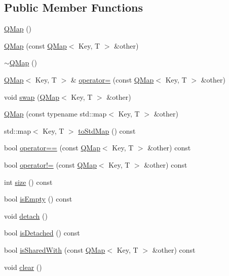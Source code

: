 \subsection*{Public Member Functions}
\begin{DoxyCompactItemize}
\item 
\hyperlink{class_q_map_a72c9b87bd2e154fc1a0afc0bd6cc4223}{Q\+Map} ()
\item 
\hyperlink{class_q_map_ab4f75cfffb9554773b5fad068720f00e}{Q\+Map} (const \hyperlink{class_q_map}{Q\+Map}$<$ Key, T $>$ \&other)
\item 
\hyperlink{class_q_map_aa171c2af7b745664c156055dc53a3929}{$\sim$\+Q\+Map} ()
\item 
\hyperlink{class_q_map}{Q\+Map}$<$ Key, T $>$ \& \hyperlink{class_q_map_ad04759cfb5b1ed0f3d35a2a16f45ae54}{operator=} (const \hyperlink{class_q_map}{Q\+Map}$<$ Key, T $>$ \&other)
\item 
void \hyperlink{class_q_map_ac85cda6eaaa3b14867da113f6f69acc3}{swap} (\hyperlink{class_q_map}{Q\+Map}$<$ Key, T $>$ \&other)
\item 
\hyperlink{class_q_map_a2ad69d3ba805cd31d586b26218f16dd6}{Q\+Map} (const typename std\+::map$<$ Key, T $>$ \&other)
\item 
std\+::map$<$ Key, T $>$ \hyperlink{class_q_map_aafa61193d3960d804719c2e611533438}{to\+Std\+Map} () const 
\item 
bool \hyperlink{class_q_map_afe77d0e5e8feb53142b48b2e9ec8b7fa}{operator==} (const \hyperlink{class_q_map}{Q\+Map}$<$ Key, T $>$ \&other) const 
\item 
bool \hyperlink{class_q_map_a0e25c738535f0c64fe684d7e89097d57}{operator!=} (const \hyperlink{class_q_map}{Q\+Map}$<$ Key, T $>$ \&other) const 
\item 
int \hyperlink{class_q_map_a1e80b0b61a702ec2996f6a3d01425108}{size} () const 
\item 
bool \hyperlink{class_q_map_a33cfb24195273a5e70dcc48644368a99}{is\+Empty} () const 
\item 
void \hyperlink{class_q_map_a6913ba3a784e35a4b0d274f229af92ea}{detach} ()
\item 
bool \hyperlink{class_q_map_a0386f837a8b99aca59b01d7c5d04b202}{is\+Detached} () const 
\item 
bool \hyperlink{class_q_map_ae5cfba01ae8fc15b7b05ccc76129385f}{is\+Shared\+With} (const \hyperlink{class_q_map}{Q\+Map}$<$ Key, T $>$ \&other) const 
\item 
void \hyperlink{class_q_map_acdbbd64e3cd0a6dae1ac57c1d41aacab}{clear} ()

\end{DoxyCompactItemize}

